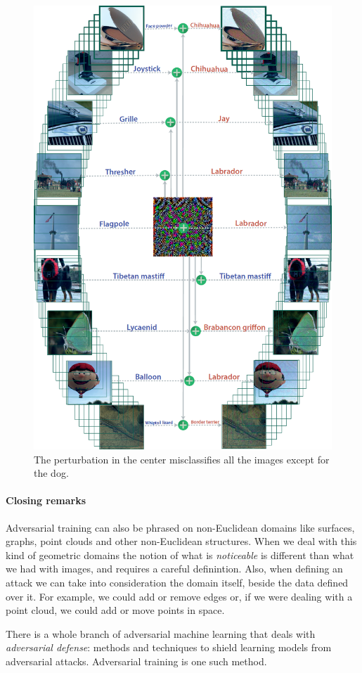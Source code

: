 \begin{figure}[H]
    \centering
    \includegraphics[width=.7\textwidth]{figures/13/universal.png}
    \caption{The perturbation in the center misclassifies all the images except for the dog.}
\end{figure}

\paragraph{Closing remarks}

Adversarial training can also be phrased on non-Euclidean domains like surfaces, graphs, point clouds and other non-Euclidean structures. 
When we deal with this kind of geometric domains the notion of what is \emph{noticeable} is different than what we had with images, and requires a careful definintion. Also, when defining an attack we can take into consideration the domain itself, beside the data defined over it. For example, we could add or remove edges or, if we were dealing with a point cloud, we could add or move points in space.  

There is a whole branch of adversarial machine learning that deals with \emph{adversarial defense}: methods and techniques to shield learning models from adversarial attacks. Adversarial training is one such method.
